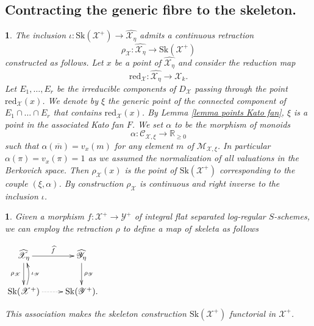 \documentclass{amsart}%
\numberwithin{equation}{subsection}
\theoremstyle{plain2}
\theoremstyle{definition2}
\theoremstyle{stepstyle}
\theoremstyle{point}
\theoremstyle{subpoint}
\newtheorem{subpoint}[equation]{}%
\newcommand{\spa}[1]{\begin{subpoint}#1\end{subpoint}}           %
\newcommand{\R}{\ensuremath{\mathbb{R}}}
\newcommand{\cX}{\ensuremath{\mathscr{X}}}
\newcommand{\caM}{\ensuremath{\mathcal{M}}}
\newcommand{\caC}{\ensuremath{\mathcal{C}}}
\newcommand{\cY}{\ensuremath{\mathscr{Y}}}
\renewcommand{\R}{\ensuremath{\mathbb{R}}}
\renewcommand{\cY}{\ensuremath{\mathscr{Y}}}
\newcommand{\redu}{\mathrm{red}}
\newcommand{\Sk}{\mathrm{Sk}}
\begin{document}
\subsection{Contracting the generic fibre to the skeleton.}
\spa{The inclusion $\iota: \Sk(\cX^+) \rightarrow \widehat{\cX_{\eta}}$ admits a continuous retraction $$\rho_\cX: \widehat{\cX_{\eta}} \rightarrow \Sk(\cX^+)$$ constructed as follows. Let $x$ be a point of $\widehat{\cX_{\eta}}$ and consider the reduction map $$\redu_{\cX}:\widehat{\cX_{\eta}} \rightarrow \cX_k.$$ Let $E_1, \ldots, E_r$ be the irreducible components of $D_\cX$ passing through the point $\redu_\cX(x)$. We denote by $\xi$ the generic point of the connected component of $E_1 \cap \ldots \cap E_r$ that contains $\redu_\cX(x)$. By Lemma \ref{lemma points Kato fan}, $\xi$ is a point in the associated Kato fan $F$. We set $\alpha$ to be the morphism of monoids $$\alpha: \caC_{\cX,\xi} \rightarrow \R_{\geqslant 0 }$$ such that $\alpha(\overline{m}) = v_x(m)$ for any element $m$ of $\caM_{\cX,\xi}$. In particular $\alpha(\pi)= v_x(\pi)=1$ as we assumed the normalization of all valuations in the Berkovich space. Then $\rho_\cX(x)$ is the point of $\Sk(\cX^+)$ corresponding to the couple $(\xi,\alpha)$. By construction $\rho_\cX$ is continuous and right inverse to the inclusion $\iota$. 
}

\spa{Given a morphism $f: \cX^+ \rightarrow \cY^+$ of integral flat separated log-regular $S$-schemes, we can employ the retraction $\rho$ to define a map of skeleta as follows
\begin{center}
$\begin{gathered}
\xymatrixcolsep{2pc} \xymatrix{
 \widehat{\cX_{\eta}} \ar[r]^-{\widehat{f}} \ar[d]_{\rho_\cX} & \widehat{\cY_{\eta}} \ar[d]^{\rho_\cY}\\
  \Sk(\cX^+) \ar@{.>}[r]^{} \ar@/_/[u]_-{\iota_\cY}  & \Sk(\cY^+).
}
\end{gathered}$\end{center} This association makes the skeleton construction $\Sk(\cX^+)$ functorial in $\cX^+$.
}
\end{document}
